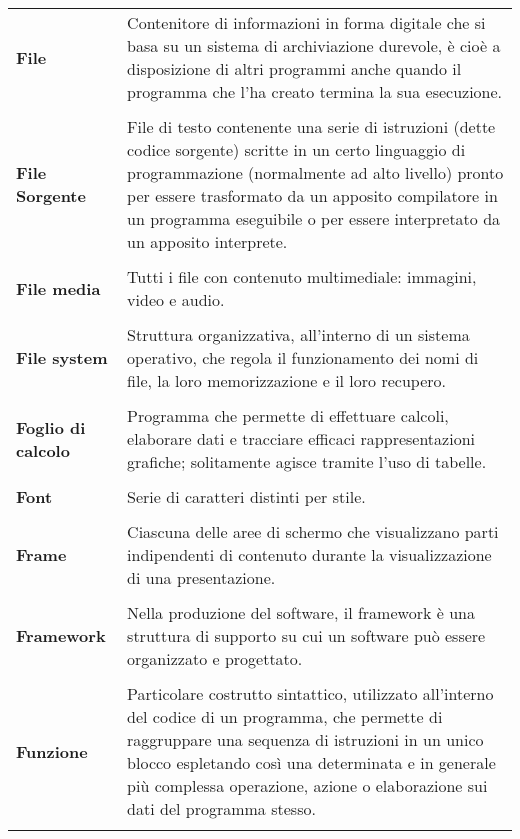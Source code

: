\begin{longtable}{L{4cm} p{10cm}}
\textbf{File} & Contenitore di informazioni in forma digitale che si basa su un sistema di archiviazione durevole, è cioè a disposizione di altri programmi anche quando il programma che l’ha creato termina la sua esecuzione. \\ 
 \\ 
\textbf{File Sorgente} & File di testo contenente una serie di istruzioni (dette codice sorgente) scritte in un certo linguaggio di programmazione (normalmente ad alto livello) pronto per essere trasformato da un apposito compilatore in un programma eseguibile o per essere interpretato da un apposito interprete. \\ 
 \\ 
\textbf{File media} & Tutti i file con contenuto multimediale: immagini, video e audio. \\ 
 \\ 
\textbf{File system} & Struttura organizzativa, all’interno di un sistema operativo, che regola il funzionamento dei nomi di file, la loro memorizzazione e il loro recupero. \\ 
 \\ 
\textbf{Foglio di calcolo} & Programma che permette di effettuare calcoli, elaborare dati e tracciare efficaci rappresentazioni grafiche; solitamente agisce tramite l’uso di tabelle. \\ 
 \\ 
\textbf{Font} & Serie di caratteri distinti per stile. \\ 
 \\ 
\textbf{Frame} & Ciascuna delle aree di schermo che visualizzano parti indipendenti di contenuto durante la visualizzazione di una presentazione. \\ 
 \\ 
\textbf{Framework} & Nella produzione del software, il framework è una struttura di supporto su cui un software può essere organizzato e progettato. \\ 
 \\ 
\textbf{Funzione} & Particolare costrutto sintattico, utilizzato all’interno del codice di un programma, che permette di raggruppare una sequenza di istruzioni in un unico blocco espletando così una determinata e in generale più complessa operazione, azione o elaborazione sui dati del programma stesso. \\ 
 \\ 
\end{longtable} 
\newpage 
{} 
{} 
